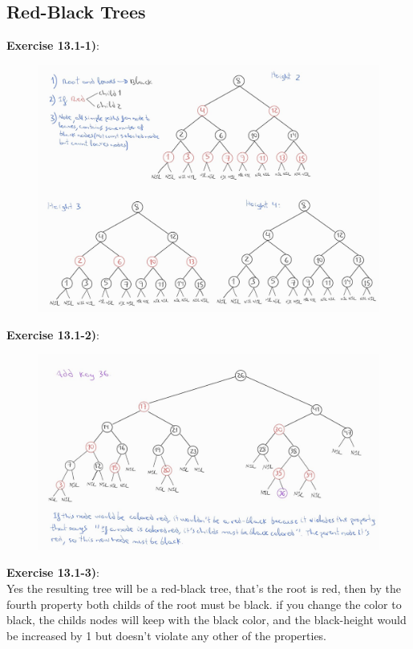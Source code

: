\documentclass{article}
\newcounter{exercise}[section]   %
\begin{document}
\subsection{Red-Black Trees}
\textbf{Exercise 13.1-1)}:
\begin{figure}[h]
    \includegraphics[scale=0.3]{Problem13_1_1.jpeg}
    \centering
\end{figure}
\newpage

\textbf{Exercise 13.1-2)}:
\begin{figure}[h]
    \includegraphics[scale=0.3]{Problem13_1_2.jpeg}
    \centering
\end{figure}

\textbf{Exercise 13.1-3)}:\\
Yes the resulting tree will be a red-black tree, that's the root is red, then by the fourth
property both childs of the root must be black. if you change the color to black, the childs
nodes will keep with the black color, and the black-height would be increased by 1 but doesn't
violate any other of the properties.  
\end{document}
